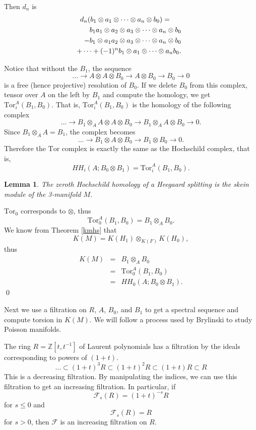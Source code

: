 \documentclass{slides}
\newcommand{\ot}{\otimes}
\newtheorem{lemma}{Lemma}
\begin{document}
\begin{slide}
Then $d_n$ is
\begin{eqnarray}
d_n ( b_1 \ot a_1 \ot \dots \ot a_n \ot b_0 ) & = & \nonumber \\
& & \hspace{-5cm} b_1 a_1 \ot a_2 \ot a_3 \ot \dots \ot a_n \ot b_0 \nonumber \\
& & \hspace{-5cm} - b_1 \ot a_1 a_2 \ot a_3 \ot \dots \ot a_n \ot b_0 \nonumber \\
& & \hspace{-5cm} + \dots + (-1)^{n} b_1 \ot a_1 \ot \dots \ot a_n b_0. \nonumber
\end{eqnarray}

Notice that without the $B_1$, the sequence
$$\dots \to A \ot A \ot B_0 \to
A \ot B_0 \to B_0 \to 0$$ is a free (hence projective) resolution of $B_0$.
If we delete $B_0$ from this complex, tensor over $A$ on the left by $B_1$
and compute the homology, we get $\mathrm{Tor}_i^A(B_1, B_0)$.
That is, $\mathrm{Tor}_i^A(B_1,B_0)$ is the homology of the following complex
$$\dots \to B_1 \ot_A
A \ot A \ot B_0 \to B_1 \ot_A A \ot B_0 \to 0.$$
Since $B_1 \ot_A A = B_1$, the complex becomes
$$\dots \to B_1 \ot A \ot B_0
\to B_1 \ot B_0 \to 0.$$
Therefore the $\mathrm{Tor}$ complex is exactly the same as the
Hochschild complex, that is,
\[HH_i(A; B_0 \ot B_1) = \mathrm{Tor}_i^A(B_1, B_0).\]
\end{slide}

\begin{slide}
\begin{lemma}
The zeroth Hochschild homology of a Heegaard splitting
is the skein module of the 3-manifold $M$.
\end{lemma}

\proof
$\mathrm{Tor}_0$ corresponds to $\ot$, thus
$$\mathrm{Tor}_0^A(B_1, B_0) = B_1 \ot_A B_0.$$
We know from Theorem \ref{kmhs} that $$K(M) = K(H_1) \ot_{K(F)} K(H_0),$$ thus
\begin{eqnarray}
K(M) & = & B_1 \ot_A B_0 \nonumber \\
& = & \mathrm{Tor}_0^A(B_1, B_0) \nonumber \\
& = & HH_0(A; B_0 \ot B_1). \nonumber
\end{eqnarray}
\qed
\end{slide}

\begin{slide}
Next we use a filtration on $R$, $A$, $B_0$, and $B_1$ to get a
spectral sequence and compute torsion in $K(M)$.  We will follow
a process used by Brylinski to study Poisson
manifolds.

The ring $R = \mathbb{Z}[t,t^{-1}]$ of Laurent polynomials has a
filtration by the ideals corresponding to powers of $(1+t)$.
\[\dots \subset (1+t)^3 R \subset (1+t)^2 R \subset (1+t) R \subset R\]
This is a decreasing filtration.  By manipulating the indices, we can
use this filtration to get an increasing filtration.  In particular, if
$$\mathcal{F}_s(R) = (1+t)^{-s} R$$ for $s \leq 0$ and
$$\mathcal{F}_s(R) = R$$ for $s > 0$, then $\mathcal{F}$ is
an increasing filtration on $R$.
\end{slide}
\end{document}
